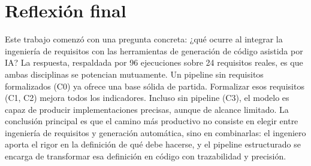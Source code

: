 \section{Reflexi\'on final}

Este trabajo comenz\'o con una pregunta concreta: ¿qu\'e ocurre al integrar la ingenier\'ia de requisitos con las herramientas de generaci\'on de c\'odigo asistida por IA? La respuesta, respaldada por 96 ejecuciones sobre 24 requisitos reales, es que ambas disciplinas se potencian mutuamente. Un pipeline sin requisitos formalizados (C0) ya ofrece una base s\'olida de partida. Formalizar esos requisitos (C1, C2) mejora todos los indicadores. Incluso sin pipeline (C3), el modelo es capaz de producir implementaciones precisas, aunque de alcance limitado. La conclusi\'on principal es que el camino m\'as productivo no consiste en elegir entre ingenier\'ia de requisitos y generaci\'on autom\'atica, sino en combinarlas: el ingeniero aporta el rigor en la definici\'on de qu\'e debe hacerse, y el pipeline estructurado se encarga de transformar esa definici\'on en c\'odigo con trazabilidad y precisi\'on.
